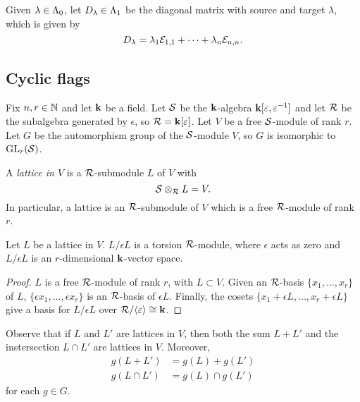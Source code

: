 \documentclass[a4paper, 11pt]{report}
\begin{document}
Given $\lambda\in\Lambda_0{}$, let $D_{\lambda}\in\Lambda_1{}$ be the diagonal matrix with source and target $\lambda$, which is given by 
\begin{equation}\label{eq:diagonal-matrices}
D_{\lambda} = \lambda_1\mathcal{E}_{1,1} +\cdots +\lambda_n\mathcal{E}_{n,n}.
\end{equation}

\subsection{Cyclic flags}

Fix $n,r\in\mathbb{N}$ and let $\mathbf{k}$ be a field. Let $\mathcal{S}$ be the $\mathbf{k}$-algebra $\mathbf{k}[\varepsilon,\varepsilon^{-1}]$ and let $\mathcal{R}$ be the subalgebra generated by $\epsilon$, so $\mathcal{R} = \mathbf{k}[\varepsilon]$. Let $V$ be a free $\mathcal{S}$-module of rank $r$. Let $G$ be the automorphism group of the $\mathcal{S}$-module $V$, so $G$ is isomorphic to $\operatorname{GL}_{r}(\mathcal{S})$.

\begin{definition}\label{definition:lattice}
A \emph{lattice in $V$} is a $\mathcal{R}$-submodule $L$ of $V$ with
\begin{equation*}
\mathcal{S}\otimes_{\mathcal{R}} L = V.
\end{equation*}
In particular, a lattice is an $\mathcal{R}$-submodule of $V$ which is a free $\mathcal{R}$-module of rank $r$.
\end{definition}

\begin{lemma}
Let $L$ be a lattice in $V$. $L/{\epsilon L}$ is a torsion $\mathcal{R}$-module, where $\epsilon$ acts as zero and $L/{\epsilon L}$ is an $r$-dimensional $\mathbf{k}$-vector space.
\end{lemma}

\begin{proof}
$L$ is a free $\mathcal{R}$-module of rank $r$, with $L\subset V$. Given an $\mathcal{R}$-basis $\{x_1,\ldots,x_r\}$ of $L$, $\{\epsilon x_1,\ldots, \epsilon x_r\}$ is an $\mathcal{R}$-basis of $\epsilon L$. Finally, the cosets $\{ x_1 + \epsilon L,\ldots, x_r + \epsilon L\}$ give a basis for $L/{\epsilon L}$ over $\mathcal{R}/{\langle \varepsilon\rangle}\cong \mathbf{k}$.
\end{proof}

Observe that if $L$ and $L'$ are lattices in $V$, then both the sum $L+L'$ and the instersection $L\cap L'$ are lattices in $V$. Moreover,
\begin{align*}
g(L+L') &= g(L) + g(L')\\
g(L\cap L') &= g(L)\cap g(L')
\end{align*}
for each $g\in G$.
\end{document}
